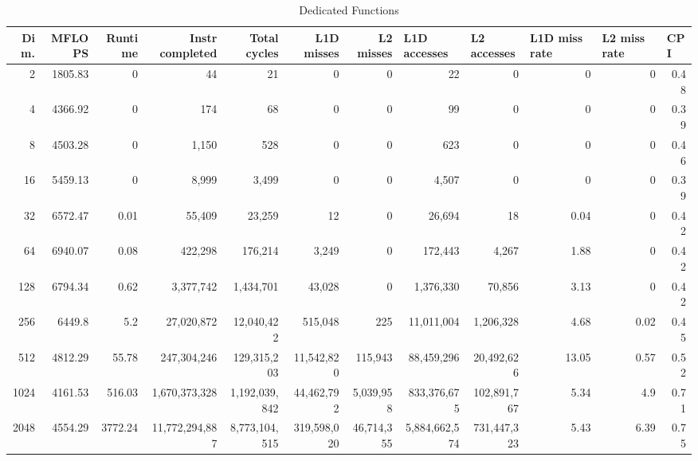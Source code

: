\documentclass{article}
\begin{document}
\begin{table}[htbp]
\tiny
\caption{Dedicated Functions}
\begin{tabular}{|r|r|r|r|r|r|r|r|r|r|r|r|}
\hline
Dim. &   MFLOPS &     Runtime & Instr completed & Total cycles & L1D misses & L2 misses & \multicolumn{1}{l|}{L1D accesses} & \multicolumn{1}{l|}{ L2 accesses} & \multicolumn{1}{l|}{L1D miss rate} & \multicolumn{1}{l|}{L2 miss rate} & \multicolumn{1}{l|}{CPI} \\ \hline
2 & 1805.83 & 0 & 44 & 21 & 0 & 0 & 22 & 0 & 0 & 0 & 0.48 \\ \hline
4 & 4366.92 & 0 & 174 & 68 & 0 & 0 & 99 & 0 & 0 & 0 & 0.39 \\ \hline
8 & 4503.28 & 0 & 1,150 & 528 & 0 & 0 & 623 & 0 & 0 & 0 & 0.46 \\ \hline
16 & 5459.13 & 0 & 8,999 & 3,499 & 0 & 0 & 4,507 & 0 & 0 & 0 & 0.39 \\ \hline
32 & 6572.47 & 0.01 & 55,409 & 23,259 & 12 & 0 & 26,694 & 18 & 0.04 & 0 & 0.42 \\ \hline
64 & 6940.07 & 0.08 & 422,298 & 176,214 & 3,249 & 0 & 172,443 & 4,267 & 1.88 & 0 & 0.42 \\ \hline
128 & 6794.34 & 0.62 & 3,377,742 & 1,434,701 & 43,028 & 0 & 1,376,330 & 70,856 & 3.13 & 0 & 0.42 \\ \hline
256 & 6449.8 & 5.2 & 27,020,872 & 12,040,422 & 515,048 & 225 & 11,011,004 & 1,206,328 & 4.68 & 0.02 & 0.45 \\ \hline
512 & 4812.29 & 55.78 & 247,304,246 & 129,315,203 & 11,542,820 & 115,943 & 88,459,296 & 20,492,626 & 13.05 & 0.57 & 0.52 \\ \hline
1024 & 4161.53 & 516.03 & 1,670,373,328 & 1,192,039,842 & 44,462,792 & 5,039,958 & 833,376,675 & 102,891,767 & 5.34 & 4.9 & 0.71 \\ \hline
2048 & 4554.29 & 3772.24 & 11,772,294,887 & 8,773,104,515 & 319,598,020 & 46,714,355 & 5,884,662,574 & 731,447,323 & 5.43 & 6.39 & 0.75 \\ \hline
\end{tabular}
\label{}
\end{table}
\end{document}
